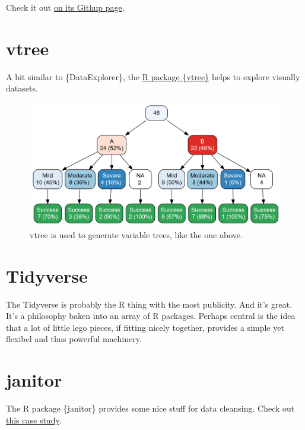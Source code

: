 \documentclass[
  letterpaper,
  DIV=11,
  numbers=noendperiod]{scrreprt}
\theoremstyle{definition}
\theoremstyle{definition}
\theoremstyle{remark}
\begin{document}
Check it out \href{http://boxuancui.github.io/DataExplorer/}{on its
Githup page}.

\hypertarget{vtree}{%
\section{vtree}\label{vtree}}

A bit similar to \{DataExplorer\}, the
\href{https://nbarrowman.github.io/vtree}{R package \{vtree\}} helps to
explore visually datasets.

\begin{figure}

{\centering \includegraphics{./img/vtree-vertical.png}

}

\caption{vtree is used to generate variable trees, like the one above.}

\end{figure}

\hypertarget{tidyverse}{%
\section{Tidyverse}\label{tidyverse}}

The Tidyverse is probably the R thing with the most publicity. And it's
great. It's a philosophy baken into an array of R packages. Perhaps
central is the idea that a lot of little lego pieces, if fitting nicely
together, provides a simple yet flexibel and thus powerful machinery.

\hypertarget{janitor}{%
\section{janitor}\label{janitor}}

The R package \{janitor\} provides some nice stuff for data cleansing.
Check out
\href{https://www.exploringdata.org/post/how-to-clean-data-janitor-package/}{this
case study}.
\end{document}
